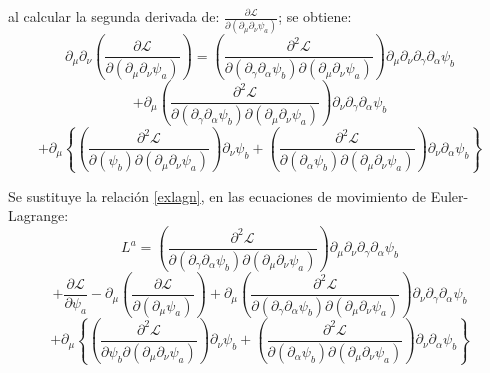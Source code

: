 \documentclass[a4paper,12pt]{article}
\begin{document}
al calcular la segunda derivada de: $\frac{\partial\mathscr{L} }{\partial(\partial_{\mu}\partial_{\nu} \psi_a)}$; se obtiene: 
\begin{equation}
\partial_{\mu}\partial_{\nu}\left(\frac{\partial\mathscr{L} }{\partial(\partial_{\mu}\partial_{\nu} \psi_a)}\right)= \left(\frac{\partial^2\mathscr{L} }{\partial( \partial_\gamma\partial_\alpha\psi_b)\partial(\partial_{\mu}\partial_{\nu} \psi_a)}\right)\partial_\mu\partial_\nu\partial_\gamma\partial_\alpha\psi_b
\label{exlagn}
\end{equation}
$$+\partial_{\mu}\left(\frac{\partial^2\mathscr{L} }{\partial( \partial_\gamma\partial_\alpha\psi_b)\partial(\partial_{\mu}\partial_{\nu} \psi_a)}\right)\partial_\nu\partial_\gamma\partial_\alpha\psi_b$$
$$+\partial_\mu\left\{\left(\frac{\partial^2\mathscr{L} }{\partial (\psi_b)\partial(\partial_{\mu}\partial_{\nu} \psi_a)}\right)\partial_\nu\psi_b+ \left(\frac{\partial^2\mathscr{L} }{\partial( \partial_\alpha\psi_b)\partial(\partial_{\mu}\partial_{\nu} \psi_a)}\right)\partial_\nu\partial_\alpha\psi_b\right\}$$
\vspace{0,1cm}

Se sustituye la relación \eqref{exlagn}, en las ecuaciones de movimiento de Euler-Lagrange:
\begin{equation}
L^a=\left(\frac{\partial^2\mathscr{L} }{\partial( \partial_\gamma\partial_\alpha\psi_b)\partial(\partial_{\mu}\partial_{\nu} \psi_a)}\right)\partial_\mu\partial_\nu\partial_\gamma\partial_\alpha\psi_b
\end{equation}
$$+\frac{\partial\mathscr{L} }{\partial \psi_a}-\partial_{\mu}\left(\frac{\partial\mathscr{L} }{\partial(\partial_{\mu} \psi_a)}\right) +\partial_{\mu}\left(\frac{\partial^2\mathscr{L} }{\partial( \partial_\gamma\partial_\alpha\psi_b)\partial(\partial_{\mu}\partial_{\nu} \psi_a)}\right)\partial_\nu\partial_\gamma\partial_\alpha\psi_b$$
$$+\partial_\mu\left\{\left(\frac{\partial^2\mathscr{L} }{\partial \psi_b\partial(\partial_{\mu}\partial_{\nu} \psi_a)}\right)\partial_\nu\psi_b+ \left(\frac{\partial^2\mathscr{L} }{\partial( \partial_\alpha\psi_b)\partial(\partial_{\mu}\partial_{\nu} \psi_a)}\right)\partial_\nu\partial_\alpha\psi_b\right\}$$
\vspace{0,1cm}
\end{document}
